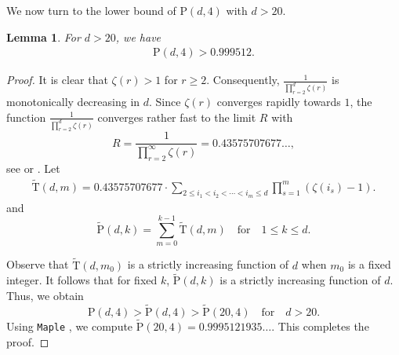 \documentclass[reqno, 12pt]{article}
\newtheorem{lem}[thm]{Lemma}
\theoremstyle{mydefinition}
\theoremstyle{myremark}
\numberwithin{algorithm}{section}
\begin{document}
We now turn to the lower bound of $\mathrm P(d,4)$ with $d> 20$.
\begin{lem}\label{lem-P(d,4)-pro}
For $d>20$, we have
\begin{align*}
\mathrm P(d,4)>0.999512.
\end{align*}
\end{lem}
\begin{proof}
It is clear that $\zeta(r)>1$ for $r\geq 2$.
Consequently, $\frac{1}{\prod_{r=2}^d \zeta(r)}$ is monotonically decreasing in $d$.
Since $\zeta(r)$ converges rapidly towards $1$, the function $\frac{1}{\prod_{r=2}^d \zeta(r)}$ converges rather fast to the limit $R$ with
$$R=\frac{1}{\prod_{r=2}^{\infty} \zeta(r)}=0.43575707677\ldots,$$
see \cite{MAZE20112398} or \cite[A021002]{Sloane23}.
Let
\begin{align*}
\mathrm{\widetilde{T}}(d,m)=0.43575707677 \cdot \sum_{2\leq i_1<i_2<\cdots <i_m\leq d} \prod_{s=1}^m (\zeta(i_s)-1).
\end{align*}
and
$$\mathrm{\widetilde{P}}(d,k)= \sum_{m=0}^{k-1} \mathrm{\widetilde{T}}(d,m)\quad \text{for}\quad 1\leq k\leq d.$$

Observe that $\mathrm{\widetilde{T}}(d,m_0)$ is a strictly increasing function of $d$ when $m_0$ is a fixed integer.
It follows that for fixed $k$, $\mathrm{\widetilde{P}}(d,k)$ is a strictly increasing function of $d$.
Thus, we obtain
$$\mathrm{P}(d,4)>\mathrm{\widetilde{P}}(d,4)>\mathrm{\widetilde{P}}(20,4)\quad \text{for}\quad d> 20.$$
Using \texttt{Maple} \cite{Maple}, we compute $\mathrm{\widetilde{P}}(20,4)=0.9995121935\ldots$.
This completes the proof.
\end{proof}
\end{document}
